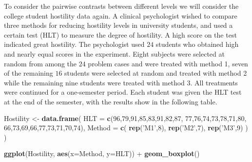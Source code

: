 \documentclass[]{book}
\newenvironment{Shaded}{\begin{snugshade}}{\end{snugshade}}
\newcommand{\KeywordTok}[1]{\textcolor[rgb]{0.13,0.29,0.53}{\textbf{{#1}}}}
\newcommand{\DataTypeTok}[1]{\textcolor[rgb]{0.13,0.29,0.53}{{#1}}}
\newcommand{\DecValTok}[1]{\textcolor[rgb]{0.00,0.00,0.81}{{#1}}}
\newcommand{\StringTok}[1]{\textcolor[rgb]{0.31,0.60,0.02}{{#1}}}
\newcommand{\NormalTok}[1]{{#1}}
\theoremstyle{definition}
\theoremstyle{definition}
\theoremstyle{remark}
\begin{document}
To consider the pairwise contrasts between different levels we will
consider the college student hostility data again. A clinical
psychologist wished to compare three methods for reducing hostility
levels in university students, and used a certain test (HLT) to measure
the degree of hostility. A high score on the test indicated great
hostility. The psychologist used \(24\) students who obtained high and
nearly equal scores in the experiment. Eight subjects were selected at
random from among the \(24\) problem cases and were treated with method
1, seven of the remaining \(16\) students were selected at random and
treated with method 2 while the remaining nine students were treated
with method 3. All treatments were continued for a one-semester period.
Each student was given the HLT test at the end of the semester, with the
results show in the following table.

\begin{Shaded}
\begin{Highlighting}[]
\NormalTok{Hostility <-}\StringTok{ }\KeywordTok{data.frame}\NormalTok{(}
  \DataTypeTok{HLT =} \KeywordTok{c}\NormalTok{(}\DecValTok{96}\NormalTok{,}\DecValTok{79}\NormalTok{,}\DecValTok{91}\NormalTok{,}\DecValTok{85}\NormalTok{,}\DecValTok{83}\NormalTok{,}\DecValTok{91}\NormalTok{,}\DecValTok{82}\NormalTok{,}\DecValTok{87}\NormalTok{,}
          \DecValTok{77}\NormalTok{,}\DecValTok{76}\NormalTok{,}\DecValTok{74}\NormalTok{,}\DecValTok{73}\NormalTok{,}\DecValTok{78}\NormalTok{,}\DecValTok{71}\NormalTok{,}\DecValTok{80}\NormalTok{,}
          \DecValTok{66}\NormalTok{,}\DecValTok{73}\NormalTok{,}\DecValTok{69}\NormalTok{,}\DecValTok{66}\NormalTok{,}\DecValTok{77}\NormalTok{,}\DecValTok{73}\NormalTok{,}\DecValTok{71}\NormalTok{,}\DecValTok{70}\NormalTok{,}\DecValTok{74}\NormalTok{),}
  \DataTypeTok{Method =} \KeywordTok{c}\NormalTok{( }\KeywordTok{rep}\NormalTok{(}\StringTok{'M1'}\NormalTok{,}\DecValTok{8}\NormalTok{), }\KeywordTok{rep}\NormalTok{(}\StringTok{'M2'}\NormalTok{,}\DecValTok{7}\NormalTok{), }\KeywordTok{rep}\NormalTok{(}\StringTok{'M3'}\NormalTok{,}\DecValTok{9}\NormalTok{) ) )}
\end{Highlighting}
\end{Shaded}

\begin{Shaded}
\begin{Highlighting}[]
\KeywordTok{ggplot}\NormalTok{(Hostility, }\KeywordTok{aes}\NormalTok{(}\DataTypeTok{x=}\NormalTok{Method, }\DataTypeTok{y=}\NormalTok{HLT)) +}
\StringTok{  }\KeywordTok{geom_boxplot}\NormalTok{()}
\end{Highlighting}
\end{Shaded}
\end{document}
